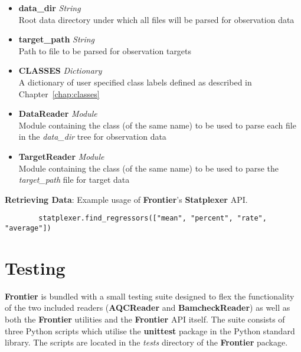\begin{itemize}
    \item \textbf{data\_dir} \textit{String}\hfill\\
        Root data directory under which all files will be parsed for observation data
    \item \textbf{target\_path} \textit{String}\hfill\\
        Path to file to be parsed for observation targets
    \item \textbf{CLASSES} \textit{Dictionary}\hfill\\
        A dictionary of user specified class labels defined as described in
        Chapter~\ref{chap:classes}
    \item \textbf{DataReader} \textit{Module}\hfill\\
        Module containing the class (of the same name) to be used to parse each
        file in the \textit{data\_dir} tree for observation data
    \item \textbf{TargetReader} \textit{Module}\hfill\\
        Module containing the class (of the same name) to be used to parse the
        \textit{target\_path} file for target data
\end{itemize}

\begin{listing}[H]
    \caption[callstatplexer]{\textbf{Retrieving Data}: Example usage of
    \textbf{Frontier}'s \textbf{Statplexer} API.}
    \label{list:callstatplexer}
    \begin{verbatim}
        statplexer.find_regressors(["mean", "percent", "rate", "average"])
    \end{verbatim}
\end{listing}


\section{Testing}

\textbf{Frontier} is bundled with a small testing suite designed to flex the
functionality of the two included readers (\textbf{AQCReader} and
\textbf{BamcheckReader}) as well as both the \textbf{Frontier} utilities and
the \textbf{Frontier} API itself. The suite consists of three Python scripts
which utilise the \textbf{unittest}\citep{py-unittest} package in the Python
standard library.  The scripts are located in the \textit{tests} directory of
the \textbf{Frontier} package.

